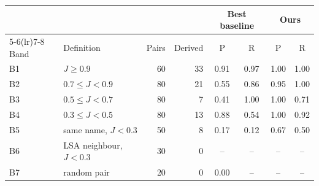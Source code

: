 \begin{tabular}{llrrcccc}
\toprule
 & & & & \multicolumn{2}{c}{Best baseline} & \multicolumn{2}{c}{Ours} \\
\cmidrule(lr){5-6}\cmidrule(lr){7-8}
Band & Definition & Pairs & Derived & P & R & P & R \\
\midrule
B1 & $J \geq 0.9$ & 60 & 33 & 0.91 & 0.97 & 1.00 & 1.00 \\
B2 & $0.7 \leq J < 0.9$ & 80 & 21 & 0.55 & 0.86 & 0.95 & 1.00 \\
B3 & $0.5 \leq J < 0.7$ & 80 & 7 & 0.41 & 1.00 & 1.00 & 0.71 \\
B4 & $0.3 \leq J < 0.5$ & 80 & 13 & 0.88 & 0.54 & 1.00 & 0.92 \\
B5 & same name, $J<0.3$ & 50 & 8 & 0.17 & 0.12 & 0.67 & 0.50 \\
B6 & LSA neighbour, $J<0.3$ & 30 & 0 & -- & -- & -- & -- \\
B7 & random pair & 20 & 0 & 0.00 & -- & -- & -- \\
\bottomrule
\end{tabular}
